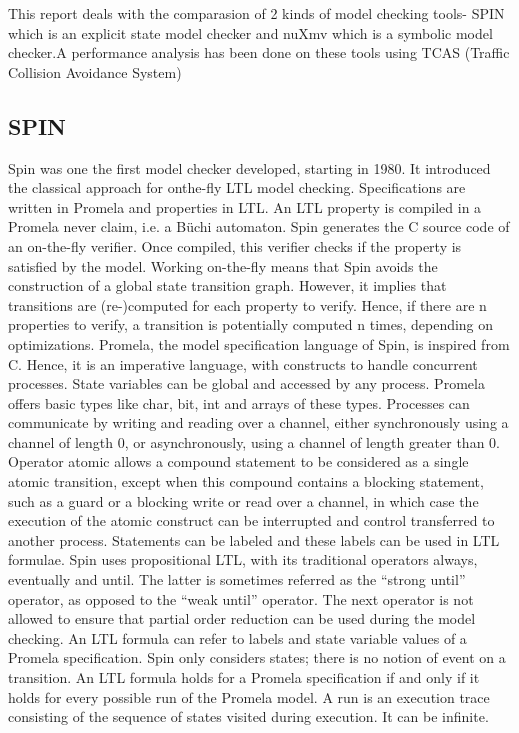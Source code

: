 \documentclass[a4paper,11pt,flegn]{article}
\begin{document}
This report deals with the comparasion of 2 kinds of model checking tools- SPIN which is an explicit state model checker and nuXmv which is a symbolic model checker.A performance analysis has been done on these tools using  TCAS (Traffic Collision Avoidance System)
\subsection{SPIN}
Spin\autocite{1} was one the first model checker developed, starting in 1980. It introduced the classical approach for onthe-fly
LTL model checking. Specifications are written in Promela and properties in LTL. An LTL property
is compiled in a Promela never claim, i.e. a Büchi automaton. Spin generates the C source code of an
on-the-fly verifier. Once compiled, this verifier checks if the property is satisfied by the model. Working
on-the-fly means that Spin avoids the construction of a global state transition graph. However, it implies
that transitions are (re-)computed for each property to verify. Hence, if there are n properties to verify, a
transition is potentially computed n times, depending on optimizations.
Promela, the model specification language of Spin, is inspired from C. Hence, it is an imperative language,
with constructs to handle concurrent processes. State variables can be global and accessed by any
process. Promela offers basic types like char, bit, int and arrays of these types. Processes can communicate
by writing and reading over a channel, either synchronously using a channel of length 0, or asynchronously,
using a channel of length greater than 0. Operator atomic allows a compound statement to be
considered as a single atomic transition, except when this compound contains a blocking statement, such as
a guard or a blocking write or read over a channel, in which case the execution of the atomic construct can
be interrupted and control transferred to another process. Statements can be labeled and these labels can be
used in LTL formulae.
Spin uses propositional LTL, with its traditional operators always, eventually and until. The latter is
sometimes referred as the “strong until” operator, as opposed to the “weak until” operator. The next operator
is not allowed to ensure that partial order reduction can be used during the model checking. An LTL formula
can refer to labels and state variable values of a Promela specification. Spin only considers states; there is
no notion of event on a transition. An LTL formula holds for a Promela specification if and only if it holds
for every possible run of the Promela model. A run is an execution trace consisting of the sequence of states
visited during execution. It can be infinite.
\end{document}
